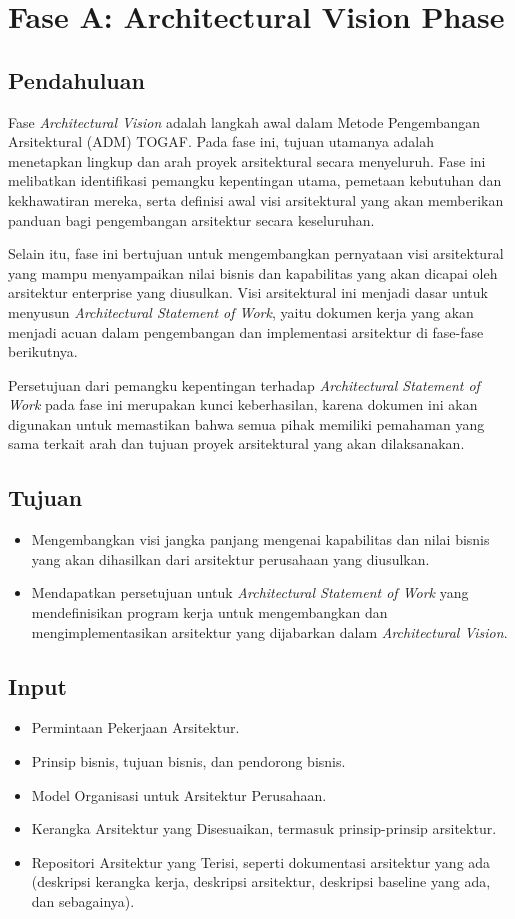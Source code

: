 \chapter{Fase A: Architectural Vision Phase}

\section{Pendahuluan}
Fase \textit{Architectural Vision} adalah langkah awal dalam Metode Pengembangan Arsitektural (ADM) TOGAF. Pada fase ini, tujuan utamanya adalah menetapkan lingkup dan arah proyek arsitektural secara menyeluruh. Fase ini melibatkan identifikasi pemangku kepentingan utama, pemetaan kebutuhan dan kekhawatiran mereka, serta definisi awal visi arsitektural yang akan memberikan panduan bagi pengembangan arsitektur secara keseluruhan.

Selain itu, fase ini bertujuan untuk mengembangkan pernyataan visi arsitektural yang mampu menyampaikan nilai bisnis dan kapabilitas yang akan dicapai oleh arsitektur enterprise yang diusulkan. Visi arsitektural ini menjadi dasar untuk menyusun \textit{Architectural Statement of Work}, yaitu dokumen kerja yang akan menjadi acuan dalam pengembangan dan implementasi arsitektur di fase-fase berikutnya. 

Persetujuan dari pemangku kepentingan terhadap \textit{Architectural Statement of Work} pada fase ini merupakan kunci keberhasilan, karena dokumen ini akan digunakan untuk memastikan bahwa semua pihak memiliki pemahaman yang sama terkait arah dan tujuan proyek arsitektural yang akan dilaksanakan.


\section{Tujuan}
\begin{itemize}
	\item Mengembangkan visi jangka panjang mengenai kapabilitas dan nilai bisnis yang akan dihasilkan dari arsitektur perusahaan yang diusulkan.
	\item Mendapatkan persetujuan untuk \textit{Architectural Statement of Work} yang mendefinisikan program kerja untuk mengembangkan dan mengimplementasikan arsitektur yang dijabarkan dalam \textit{Architectural Vision}.
\end{itemize}

\section{Input}
\begin{itemize}
	\item Permintaan Pekerjaan Arsitektur.
	\item Prinsip bisnis, tujuan bisnis, dan pendorong bisnis.
	\item Model Organisasi untuk Arsitektur Perusahaan.
	\item Kerangka Arsitektur yang Disesuaikan, termasuk prinsip-prinsip arsitektur.
	\item Repositori Arsitektur yang Terisi, seperti dokumentasi arsitektur yang ada (deskripsi kerangka kerja, deskripsi arsitektur, deskripsi baseline yang ada, dan sebagainya).
\end{itemize}


